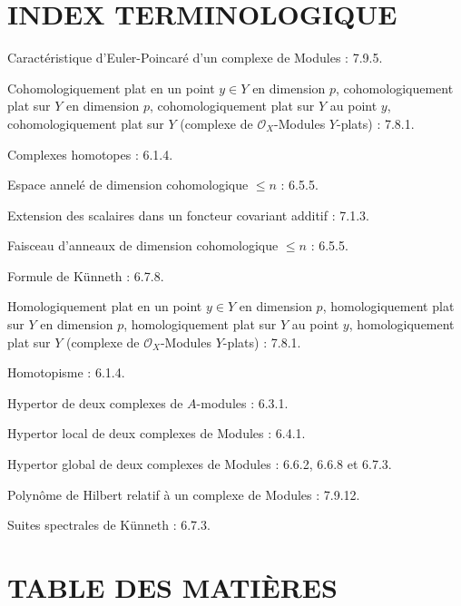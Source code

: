 \section*{INDEX TERMINOLOGIQUE}

\begin{flushleft}
Caractéristique d'Euler-Poincaré d'un complexe de Modules : 7.9.5.

\medskip
Cohomologiquement plat en un point $y\in Y$ en dimension $p$,
cohomologiquement plat sur $Y$ en dimension $p$, cohomologiquement plat sur
$Y$ au point $y$, cohomologiquement plat sur $Y$ (complexe de
$\mathscr O_X$-Modules $Y$-plats) : 7.8.1.

\medskip
Complexes homotopes : 6.1.4.

\medskip
Espace annelé de dimension cohomologique $\leq n$ : 6.5.5.

\medskip
Extension des scalaires dans un foncteur covariant additif : 7.1.3.

\medskip
Faisceau d'anneaux de dimension cohomologique $\leq n$ : 6.5.5.

\medskip
Formule de Künneth : 6.7.8.

\medskip
Homologiquement plat en un point $y\in Y$ en dimension $p$,
homologiquement plat sur $Y$ en dimension $p$, homologiquement plat sur $Y$
au point $y$, homologiquement plat sur $Y$ (complexe de $\mathscr O_X$-Modules
$Y$-plats) : 7.8.1.

\medskip
Homotopisme : 6.1.4.

\medskip
Hypertor de deux complexes de $A$-modules : 6.3.1.

\medskip
Hypertor local de deux complexes de Modules : 6.4.1.

\medskip
Hypertor global de deux complexes de Modules : 6.6.2, 6.6.8 et 6.7.3.

\medskip
Polynôme de Hilbert relatif à un complexe de Modules : 7.9.12.

\medskip
Suites spectrales de Künneth : 6.7.3.
\end{flushleft}

\clearpage
{}
\section*{TABLE DES MATIÈRES}

